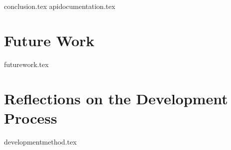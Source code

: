 {conclusion.tex}
{apidocumentation.tex}
\chapter{Future Work}
{futurework.tex}
\chapter{Reflections on the Development Process}
{developmentmethod.tex}
